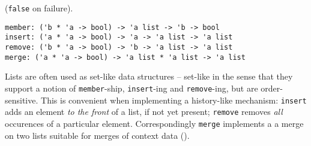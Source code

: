 \begin{isabellebody}
\begin{isamarkuptext}
  (\verb|false| on failure).%
\end{isamarkuptext}%
\isamarkuptrue%
%
\isamarkuptrue%
%
\isamarkuptrue%
%
\begin{isamarkuptext}%
\begin{mldecls}
  \verb|member: ('b * 'a -> bool) -> 'a list -> 'b -> bool| \\
  \verb|insert: ('a * 'a -> bool) -> 'a -> 'a list -> 'a list| \\
  \verb|remove: ('b * 'a -> bool) -> 'b -> 'a list -> 'a list| \\
  \verb|merge: ('a * 'a -> bool) -> 'a list * 'a list -> 'a list| \\
  \end{mldecls}%
\end{isamarkuptext}%
\isamarkuptrue%
%
\begin{isamarkuptext}%
Lists are often used as set-like data structures -- set-like in
  the sense that they support a notion of \verb|member|-ship,
  \verb|insert|-ing and \verb|remove|-ing, but are order-sensitive.
  This is convenient when implementing a history-like mechanism:
  \verb|insert| adds an element \emph{to the front} of a list,
  if not yet present; \verb|remove| removes \emph{all} occurences
  of a particular element.  Correspondingly \verb|merge| implements a 
  a merge on two lists suitable for merges of context data
  ().


\end{isamarkuptext}
\end{isabellebody}
